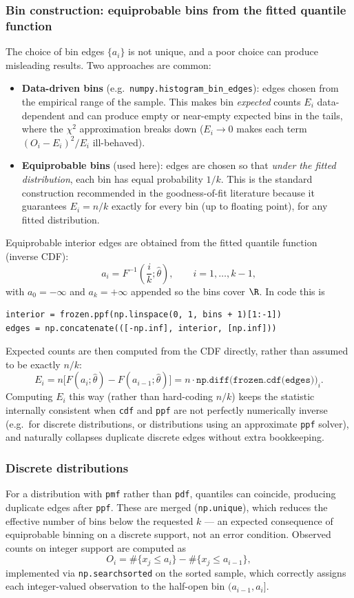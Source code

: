 \subsubsection{Bin construction: equiprobable bins from the fitted quantile function}
The choice of bin edges $\{a_i\}$ is not unique, and a poor choice can produce misleading
results. Two approaches are common:
\begin{itemize}[leftmargin=1.4em]
  \item \textbf{Data-driven bins} (e.g.\ \texttt{numpy.histogram\_bin\_edges}): edges chosen
  from the empirical range of the sample. This makes bin \emph{expected} counts $E_i$
  data-dependent and can produce empty or near-empty expected bins in the tails, where the
  $\chi^2$ approximation breaks down ($E_i \to 0$ makes each term $(O_i-E_i)^2/E_i$
  ill-behaved).
  \item \textbf{Equiprobable bins} (used here): edges are chosen so that \emph{under the
  fitted distribution}, each bin has equal probability $1/k$. This is the standard
  construction recommended in the goodness-of-fit literature because it guarantees
  $E_i = n/k$ exactly for every bin (up to floating point), for any fitted distribution.
\end{itemize}
Equiprobable interior edges are obtained from the fitted quantile function (inverse CDF):
\[
a_i = F^{-1}\!\left(\frac{i}{k};\hat\theta\right), \qquad i = 1, \dots, k-1,
\]
with $a_0=-\infty$ and $a_k=+\infty$ appended so the bins cover $\R$. In code this is
\begin{lstlisting}
interior = frozen.ppf(np.linspace(0, 1, bins + 1)[1:-1])
edges = np.concatenate(([-np.inf], interior, [np.inf]))
\end{lstlisting}
Expected counts are then computed from the CDF directly, rather than assumed to be exactly
$n/k$:
\[
E_i = n\big[F(a_i;\hat\theta) - F(a_{i-1};\hat\theta)\big]
= n \cdot \texttt{np.diff(frozen.cdf(edges))}_i .
\]
Computing $E_i$ this way (rather than hard-coding $n/k$) keeps the statistic internally
consistent when \texttt{cdf} and \texttt{ppf} are not perfectly numerically inverse (e.g.\
for discrete distributions, or distributions using an approximate \texttt{ppf} solver), and
naturally collapses duplicate discrete edges without extra bookkeeping.

\subsubsection{Discrete distributions}
For a distribution with \texttt{pmf} rather than \texttt{pdf}, quantiles can coincide,
producing duplicate edges after \texttt{ppf}. These are merged (\texttt{np.unique}), which
reduces the effective number of bins below the requested $k$ --- an expected consequence of
equiprobable binning on a discrete support, not an error condition. Observed counts on
integer support are computed as
\[
O_i = \#\{x_j \le a_i\} - \#\{x_j \le a_{i-1}\},
\]
implemented via \texttt{np.searchsorted} on the sorted sample, which correctly assigns each
integer-valued observation to the half-open bin $(a_{i-1}, a_i]$.

